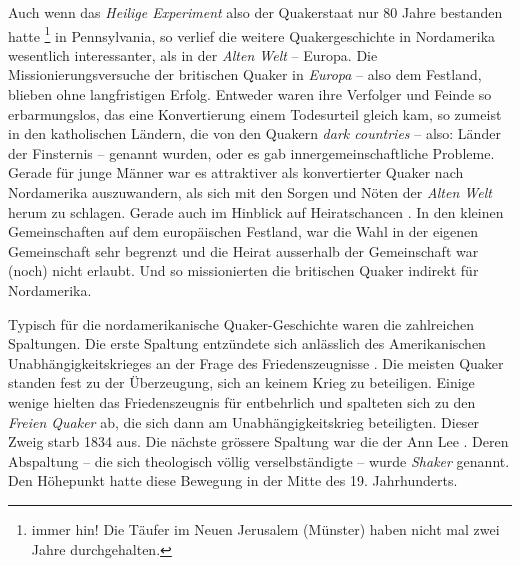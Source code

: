 \medskip

Auch wenn das \textit{Heilige Experiment} also der Quakerstaat nur 80 Jahre
bestanden hatte \footnote{immer hin! Die Täufer im Neuen Jerusalem (Münster)
  haben
nicht mal zwei Jahre durchgehalten.} in Pennsylvania, so verlief die weitere
Quakergeschichte in Nordamerika wesentlich interessanter, als in der
\textit{Alten
Welt} -- Europa. Die Missionierungsversuche  der britischen
Quaker in
\textit{Europa}  -- also dem Festland, blieben ohne
langfristigen Erfolg.
Entweder waren ihre Verfolger  und Feinde so erbarmungslos,
das eine
Konvertierung einem Todesurteil gleich kam, so zumeist in den katholischen
Ländern, die von den Quakern \textit{dark countries}  -- also: Länder der
Finsternis -- genannt wurden, oder es gab innergemeinschaftliche Probleme.
Gerade
für junge Männer war es attraktiver als konvertierter Quaker nach Nordamerika
auszuwandern, als sich mit den Sorgen und Nöten der \textit{Alten Welt} herum
zu
schlagen. Gerade auch im Hinblick auf Heiratschancen . In den
kleinen
Gemeinschaften auf dem europäischen Festland, war die Wahl in der eigenen
Gemeinschaft sehr begrenzt und die Heirat ausserhalb der Gemeinschaft war (noch)
nicht erlaubt. Und so missionierten die britischen Quaker indirekt für
Nordamerika.

\medskip

Typisch für die nordamerikanische Quaker-Geschichte waren die zahlreichen
Spaltungen. Die erste Spaltung  entzündete sich anlässlich des
Amerikanischen
Unabhängigkeitskrieges an der Frage des Friedenszeugnisse
. Die meisten Quaker
standen fest zu der Überzeugung, sich an keinem Krieg  zu
beteiligen. Einige
wenige hielten das Friedenszeugnis für entbehrlich und spalteten sich zu den
\textit{Freien Quaker}   ab,
die sich dann am Unabhängigkeitskrieg 
beteiligten. Dieser Zweig starb 1834 aus. Die nächste grössere Spaltung war die
der Ann Lee . Deren Abspaltung -- die sich theologisch
völlig verselbständigte --
wurde \textit{Shaker}  genannt. Den Höhepunkt hatte
diese Bewegung in der Mitte
des 19. Jahrhunderts.

\medskip


